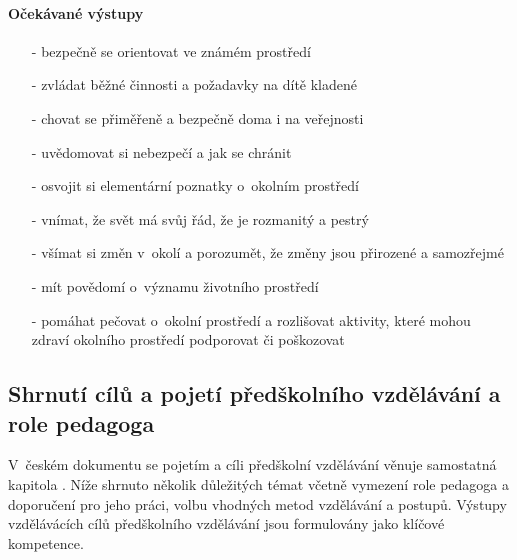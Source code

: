 				\paragraph{Očekávané výstupy}

				\begin{itemize}
				\setlength\itemsep{-2mm}
					\item[-]bezpečně se orientovat ve známém prostředí
					\item[-]zvládat běžné činnosti a požadavky na dítě kladené
					\item[-]chovat se přiměřeně a bezpečně doma i na veřejnosti
					\item[-]uvědomovat si nebezpečí a jak se chránit
					\item[-]osvojit si elementární poznatky o~okolním prostředí
					\item[-]vnímat, že svět má svůj řád, že je rozmanitý a pestrý
					\item[-]všímat si změn v~okolí a porozumět, že změny jsou přirozené a samozřejmé
					\item[-]mít povědomí o~významu životního prostředí
					\item[-]pomáhat pečovat o~okolní prostředí a rozlišovat aktivity, které mohou zdraví okolního prostředí podporovat či poškozovat
				\end{itemize}

 			\subsection{Shrnutí cílů a pojetí předškolního vzdělávání a role pedagoga}

				V~českém dokumentu se pojetím a cíli předškolní vzdělávání věnuje samostatná kapitola . Níže shrnuto několik důležitých témat včetně vymezení role pedagoga a doporučení pro jeho práci, volbu vhodných metod vzdělávání a postupů. Výstupy vzdělávácích cílů předškolního vzdělávání jsou formulovány jako klíčové kompetence.			

